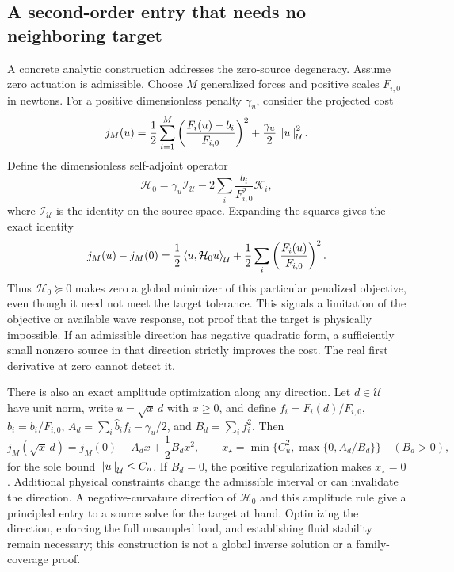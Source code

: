 \subsection{A second-order entry that needs no neighboring target}
A concrete analytic construction addresses the zero-source degeneracy. Assume
zero actuation is admissible. Choose
$M$ generalized forces and positive scales $F_{i,0}$ in newtons. For a
positive dimensionless penalty $\gamma_u$, consider the projected cost
\begin{equation}
 j_M(u)=\frac12\sum_{i=1}^M
       \left(\frac{F_i(u)-b_i}{F_{i,0}}\right)^2
                      +\frac{\gamma_u}{2}\left\lVert u\right\rVert_{\mathcal U}^2.
 \label{eq:projected-source-cost}
\end{equation}
Define the dimensionless self-adjoint operator
\begin{equation}
 \mathcal H_0=\gamma_u\mathcal I_{\mathcal U}
                   -2\sum_i\frac{b_i}{F_{i,0}^2}\mathcal K_i,
 \label{eq:zero-source-hessian}
\end{equation}
where $\mathcal I_{\mathcal U}$ is the identity on the source space. Expanding
the squares gives the exact identity
\begin{equation}
 j_M(u)-j_M(0)=\frac12\left\langle u,\mathcal H_0u\right\rangle_{\mathcal U}
                 +\frac12\sum_i\left(\frac{F_i(u)}{F_{i,0}}\right)^2.
 \label{eq:zero-source-expansion}
\end{equation}
Thus $\mathcal H_0\succeq0$ makes zero a global minimizer of this particular
penalized objective, even though it need not meet the target tolerance. This
signals a limitation of the objective or available wave response, not proof
that the target is physically impossible. If an admissible direction has
negative quadratic form, a sufficiently small nonzero source in that direction
strictly improves the cost. The real first derivative at zero cannot detect it.

There is also an exact amplitude optimization along any direction. Let
$d\in\mathcal U$ have unit norm, write $u=\sqrt{x}\,d$ with $x\geq0$,
and define $f_i=F_i(d)/F_{i,0}$, $\widehat b_i=b_i/F_{i,0}$,
$A_d=\sum_i\widehat b_i f_i-\gamma_u/2$, and $B_d=\sum_i f_i^2$.
Then
\begin{equation}
 j_M(\sqrt{x}\,d)=j_M(0)-A_dx+\frac12B_dx^2,
 \qquad
 x_\star=\min\{C_u^2,\max\{0,A_d/B_d\}\}
 \quad (B_d>0),
 \label{eq:source-ray-amplitude}
\end{equation}
for the sole bound $\left\lVert u\right\rVert_{\mathcal U}\leq C_u$. If $B_d=0$, the positive
regularization makes $x_\star=0$. Additional physical constraints change the
admissible interval or can invalidate the direction. A negative-curvature
direction of $\mathcal H_0$ and this amplitude rule give a principled entry
to a source solve for the target at hand. Optimizing the direction, enforcing
the full unsampled load, and establishing fluid stability remain necessary;
this construction is not a global inverse solution or a family-coverage proof.

